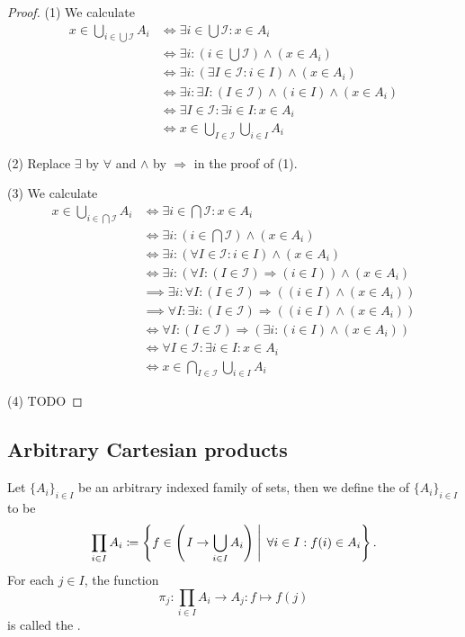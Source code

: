 \begin{proof}
(1) We calculate
\begin{align*}
x\in \bigcup_{i\in \bigcup \mathcal{I}} A_i &\iff \exists i\in \bigcup \mathcal{I}: x\in A_i \\
&\iff \exists i: (i\in \bigcup \mathcal{I}) \land (x\in A_i) \\
&\iff \exists i: (\exists I \in \mathcal{I}: i\in I) \land (x\in A_i) \\
&\iff \exists i: \exists I: (I \in \mathcal{I}) \land (i\in I) \land (x\in A_i) \\
&\iff \exists I\in \mathcal{I}: \exists i \in I: x\in A_i \\
&\iff x\in \bigcup_{I\in \mathcal{I}}\bigcup_{i\in I} A_i
\end{align*}

(2) Replace $\exists$ by $\forall$ and $\land$ by $\Rightarrow$ in the proof of (1).

(3) We calculate
\begin{align*}
x\in \bigcup_{i\in \bigcap \mathcal{I}} A_i &\iff \exists i\in \bigcap \mathcal{I}: x\in A_i \\
&\iff \exists i: (i\in \bigcap \mathcal{I}) \land (x\in A_i) \\
&\iff \exists i: (\forall I \in \mathcal{I}: i\in I) \land (x\in A_i) \\
&\iff \exists i: (\forall I: (I \in \mathcal{I}) \Rightarrow (i\in I)) \land (x\in A_i) \\
&\implies \exists i: \forall I: (I \in \mathcal{I}) \Rightarrow ((i\in I) \land (x\in A_i)) \\
&\implies \forall I: \exists i: (I \in \mathcal{I}) \Rightarrow ((i\in I) \land (x\in A_i)) \\
&\iff \forall I: (I \in \mathcal{I}) \Rightarrow (\exists i:(i\in I) \land (x\in A_i)) \\
&\iff \forall I\in \mathcal{I}: \exists i \in I: x\in A_i \\
&\iff x\in \bigcap_{I\in \mathcal{I}}\bigcup_{i\in I} A_i
\end{align*}

(4) TODO
\end{proof}

\subsection{Arbitrary Cartesian products}
\begin{definition}
Let $\{A_i\}_{i\in I}$ be an arbitrary indexed family of sets, then we define the  of $\{A_i\}_{i\in I}$ to be
\[ \prod_{i\in I}A_i \coloneqq \left\{ f\in \left(\left. I \to \bigcup_{i\in I}A_i \right) \; \right| \; \forall i\in I: f(i) \in A_i \right\}. \]
For each $j\in I$, the function
\[ \pi_j : \prod_{i\in I}A_i \to A_j: f\mapsto f(j) \]
is called the .
\end{definition}

